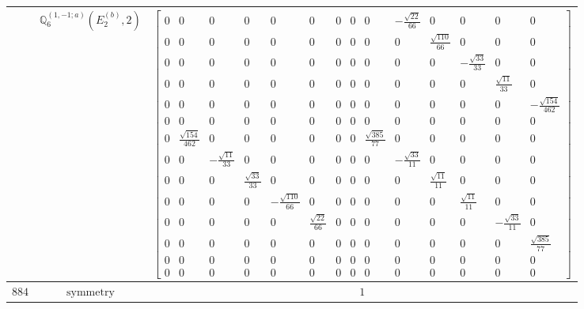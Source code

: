 \documentclass[fleqn,8pt,landscape]{jsarticle}
\begin{document}
\begin{longtable}{ccc}
$  $ & $ \mathbb{Q}_{6}^{(1,-1;a)}(E_{2}^{(b)},2) $ & $ \begin{bmatrix} 0 & 0 & 0 & 0 & 0 & 0 & 0 & 0 & 0 & - \frac{\sqrt{22}}{66} & 0 & 0 & 0 & 0 \\ 0 & 0 & 0 & 0 & 0 & 0 & 0 & 0 & 0 & 0 & \frac{\sqrt{110}}{66} & 0 & 0 & 0 \\ 0 & 0 & 0 & 0 & 0 & 0 & 0 & 0 & 0 & 0 & 0 & - \frac{\sqrt{33}}{33} & 0 & 0 \\ 0 & 0 & 0 & 0 & 0 & 0 & 0 & 0 & 0 & 0 & 0 & 0 & \frac{\sqrt{11}}{33} & 0 \\ 0 & 0 & 0 & 0 & 0 & 0 & 0 & 0 & 0 & 0 & 0 & 0 & 0 & - \frac{\sqrt{154}}{462} \\ 0 & 0 & 0 & 0 & 0 & 0 & 0 & 0 & 0 & 0 & 0 & 0 & 0 & 0 \\ 0 & \frac{\sqrt{154}}{462} & 0 & 0 & 0 & 0 & 0 & 0 & \frac{\sqrt{385}}{77} & 0 & 0 & 0 & 0 & 0 \\ 0 & 0 & - \frac{\sqrt{11}}{33} & 0 & 0 & 0 & 0 & 0 & 0 & - \frac{\sqrt{33}}{11} & 0 & 0 & 0 & 0 \\ 0 & 0 & 0 & \frac{\sqrt{33}}{33} & 0 & 0 & 0 & 0 & 0 & 0 & \frac{\sqrt{11}}{11} & 0 & 0 & 0 \\ 0 & 0 & 0 & 0 & - \frac{\sqrt{110}}{66} & 0 & 0 & 0 & 0 & 0 & 0 & \frac{\sqrt{11}}{11} & 0 & 0 \\ 0 & 0 & 0 & 0 & 0 & \frac{\sqrt{22}}{66} & 0 & 0 & 0 & 0 & 0 & 0 & - \frac{\sqrt{33}}{11} & 0 \\ 0 & 0 & 0 & 0 & 0 & 0 & 0 & 0 & 0 & 0 & 0 & 0 & 0 & \frac{\sqrt{385}}{77} \\ 0 & 0 & 0 & 0 & 0 & 0 & 0 & 0 & 0 & 0 & 0 & 0 & 0 & 0 \\ 0 & 0 & 0 & 0 & 0 & 0 & 0 & 0 & 0 & 0 & 0 & 0 & 0 & 0 \end{bmatrix} $ \\ \hline
$ 884 $ & $ \text{symmetry} $ & $ 1 $ \\

\end{longtable}
\end{document}
